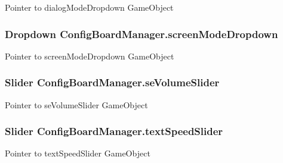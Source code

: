 Pointer to dialog\+Mode\+Dropdown Game\+Object 

\subsubsection[{\texorpdfstring{screen\+Mode\+Dropdown}{screenModeDropdown}}]{\setlength{\rightskip}{0pt plus 5cm}Dropdown Config\+Board\+Manager.\+screen\+Mode\+Dropdown}\hypertarget{class_config_board_manager_ac4c7748ebaccab2a664d2dd8caf4cd19}{}\label{class_config_board_manager_ac4c7748ebaccab2a664d2dd8caf4cd19}


Pointer to screen\+Mode\+Dropdown Game\+Object 

\subsubsection[{\texorpdfstring{se\+Volume\+Slider}{seVolumeSlider}}]{\setlength{\rightskip}{0pt plus 5cm}Slider Config\+Board\+Manager.\+se\+Volume\+Slider}\hypertarget{class_config_board_manager_a6a663883a4487153c8f134c25a16f239}{}\label{class_config_board_manager_a6a663883a4487153c8f134c25a16f239}


Pointer to se\+Volume\+Slider Game\+Object 

\subsubsection[{\texorpdfstring{text\+Speed\+Slider}{textSpeedSlider}}]{\setlength{\rightskip}{0pt plus 5cm}Slider Config\+Board\+Manager.\+text\+Speed\+Slider}\hypertarget{class_config_board_manager_a09332ad0a9411f6063ff5a9adf602377}{}\label{class_config_board_manager_a09332ad0a9411f6063ff5a9adf602377}


Pointer to text\+Speed\+Slider Game\+Object 


